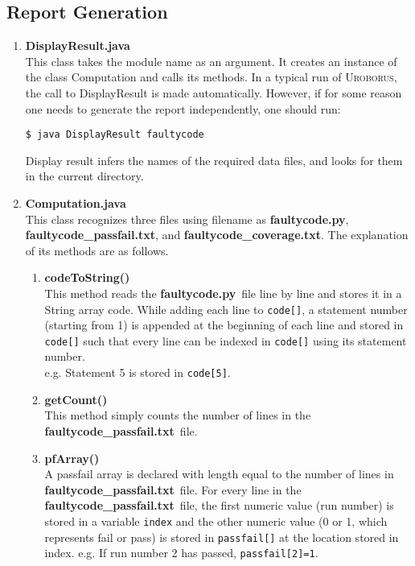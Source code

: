 \documentclass[english]{article}
\newcommand{\Uro}{\textsc{Uroborus}} \newcommand{\Taran}{\textsc{Tarantula}}
\newcommand{\fcp}{\textbf{faultycode.py}}
\newcommand{\fcc}{\textbf{faultycode\_coverage.txt}}
\newcommand{\fcpf}{\textbf{faultycode\_passfail.txt}}
\begin{document}
\subsection{Report Generation}

\begin{enumerate}
\item \textbf{DisplayResult.java} \\
This class takes the module name as an argument. It creates an instance of the class Computation and calls its methods.
In a typical run of \Uro, the call to DisplayResult is made automatically. However, if for some
reason one needs to generate the report independently, one should run:
\begin{verbatim}
$ java DisplayResult faultycode
\end{verbatim}
Display result infers the names of the required data files, and looks for them in the current
directory.

\item \textbf{Computation.java} \\
This class recognizes three files using filename as \fcp, \fcpf, and
\fcc. The explanation of its methods are as follows.

 \begin{enumerate}
 \item \textbf{codeToString()} \\
This method reads the \fcp\ file line by line and stores it in a String array code. While
adding each line to \texttt{code[]}, a statement number (starting from 1) is appended at the beginning of
each line and stored in \texttt{code[]} such that every line can be indexed in \texttt{code[]} using its statement
number. \\
e.g. Statement 5 is stored in \texttt{code[5]}.

\item \textbf{getCount()} \\
This method simply counts the number of lines in the \fcpf\ file.

\item \textbf{pfArray()} \\
A passfail array is declared with length equal to the number of lines in
\fcpf\ file.
For every line in the \fcpf\ file, the first numeric value (run number) is stored in
a variable \texttt{index} and the other numeric value (0 or 1, which represents fail or pass) is stored in
\texttt{passfail[]} at the location stored in index.
e.g. If run number 2 has passed, \texttt{passfail[2]=1}.


\end{enumerate}
\end{enumerate}
\end{document}
